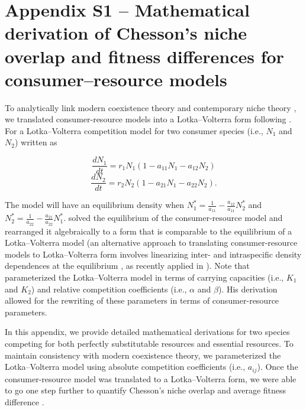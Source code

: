 \section{Appendix S1 -- Mathematical derivation of Chesson's niche overlap and fitness differences for consumer--resource models}
To analytically link modern coexistence theory \citep{Chesson2000} and contemporary niche theory \citep{Chase2003}, we translated consumer-resource models into a Lotka--Volterra form following \cite[Ch.~7]{tilman1982}. For a Lotka--Volterra competition model for two consumer species (i.e., $N_{1}$ and $N_{2}$) written as

\begin{equation}
\frac{dN_{1}}{dt}=r_{1}N_{1}\left ( 1-a_{11}N_{1}-a_{12}N_{2} \right ) 
\tag{S2.1.1}\label{eq:S2.1.1}
\end{equation}
\begin{equation}
\frac{dN_{2}}{dt}=r_{2}N_{2}\left ( 1-a_{21}N_{1}-a_{22}N_{2} \right ). 
\tag{S2.1.2}\label{eq:S2.1.2}
\end{equation}

\noindent The model will have an equilibrium density when $N_{1}^{*}=\frac{1}{a_{11}}-\frac{a_{12}}{a_{11}}N_{2}^{*}$ and $N_{2}^{*}=\frac{1}{a_{22}}-\frac{a_{21}}{a_{22}}N_{1}^{*}$. \cite{tilman1982} solved the equilibrium of the consumer-resource model and rearranged it algebraically to a form that is comparable to the equilibrium of a Lotka--Volterra model (an alternative approach to translating consumer-resource models to Lotka--Volterra form involves linearizing inter- and intraspecific density dependences at the equilibrium \citep{Meszenaz2006}, as recently applied in \cite{Kleinhesselink2015}). Note that \cite{tilman1982} parameterized the Lotka--Volterra model in terms of carrying capacities (i.e., $K_{1}$ and $K_{2}$) and relative competition coefficients (i.e., $\alpha$ and $\beta$). His derivation allowed for the rewriting of these parameters in terms of consumer-resource parameters. 
\par


In this appendix, we provide detailed mathematical derivations for two species competing for both perfectly substitutable resources and essential resources. To maintain consistency with modern coexistence theory, we parameterized the Lotka--Volterra model using absolute competition coefficients (i.e., $a_{ij}$). Once the consumer-resource model was translated to a Lotka--Volterra form, we were able to go one step further to quantify Chesson's niche overlap and average fitness difference \citep{Chesson2000, Godoy2014}. 
\par


